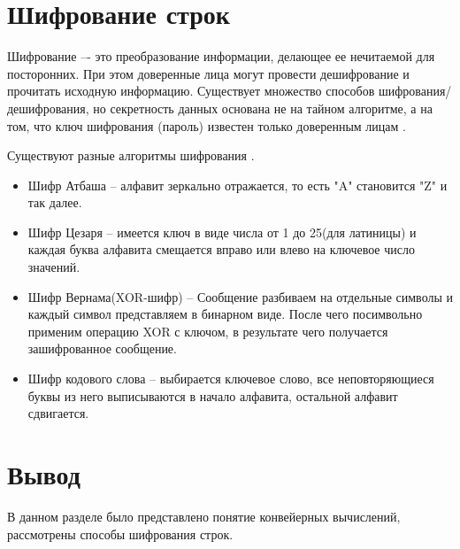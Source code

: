 \section{Шифрование строк}
Шифрование –- это преобразование информации, делающее ее нечитаемой для посторонних. При этом  доверенные лица могут провести дешифрование и прочитать исходную информацию. Существует множество способов шифрования/дешифрования, но секретность данных основана не на тайном алгоритме, а на том, что ключ шифрования (пароль) известен только доверенным лицам \cite{crypting}.
\par Существуют разные алгоритмы шифрования \cite{cr_algs}.
\begin{itemize}
	\item Шифр Атбаша -- алфавит зеркально отражается, то есть "A" становится "Z" и так далее.
	\item Шифр Цезаря -- имеется ключ в виде числа от 1 до 25(для латиницы) и каждая буква алфавита смещается вправо или влево на ключевое число значений.
	\item Шифр Вернама(XOR-шифр) -- Сообщение разбиваем на отдельные символы и каждый символ представляем в бинарном виде. После чего посимвольно применим операцию XOR с ключом, в результате чего получается зашифрованное сообщение.
	\item Шифр кодового слова -- выбирается ключевое слово, все неповторяющиеся буквы из него выписываются в начало алфавита, остальной алфавит сдвигается.
\end{itemize}

\section{Вывод}
В данном разделе было представлено понятие конвейерных вычислений, рассмотрены способы шифрования строк.